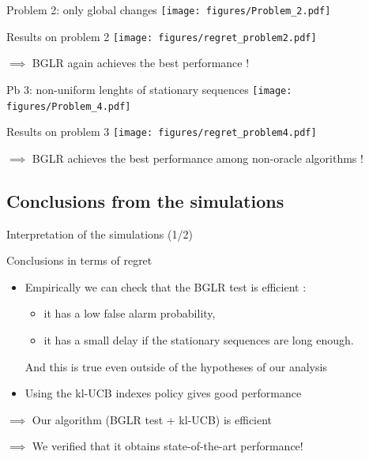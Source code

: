 \documentclass[11pt,french,ignorenonframetext,]{beamer}
\providecommand{\tightlist}{%
  \setlength{\itemsep}{0pt}\setlength{\parskip}{0pt}}
\begin{document}
\begin{frame}[plain]{Problem 2: only global changes}
  \centering
  \texttt{[image: figures/Problem\_2.pdf]}
\end{frame}

\begin{frame}[plain]{Results on problem 2}
  \centering
  \texttt{[image: figures/regret\_problem2.pdf]}

  $\implies$ BGLR again achieves the best performance \dCooley{} !
\end{frame}


\begin{frame}[plain]{Pb 3: non-uniform lenghts of stationary sequences}
  \centering
  \texttt{[image: figures/Problem\_4.pdf]}
\end{frame}

\begin{frame}[plain]{Results on problem 3}
  \centering
  \texttt{[image: figures/regret\_problem4.pdf]}

  $\implies$ BGLR achieves the best performance among non-oracle algorithms \dCooley{} !
\end{frame}


\subsection{\hfill{}Conclusions from the simulations\hfill{}}

\begin{frame}{Interpretation of the simulations (1/2)}

  \begin{block}{Conclusions in terms of regret}
    \begin{itemize}
      \item
      Empirically we can check that the \alert{BGLR test is efficient} \dCooley{} :
      \begin{itemize}\tightlist
        \item
        it has a \alert{low false alarm probability},
        \item
        it has a \alert{small delay} if the stationary sequences are long enough.
      \end{itemize}
      And this is true even outside of the hypotheses of our analysis
      \item
      Using the kl-UCB indexes policy gives good performance \dCooley{}
    \end{itemize}
    $\implies$ Our algorithm (BGLR test + kl-UCB) is efficient

    $\implies$ We verified that it obtains state-of-the-art performance!
  \end{block}

\end{frame}
\end{document}
